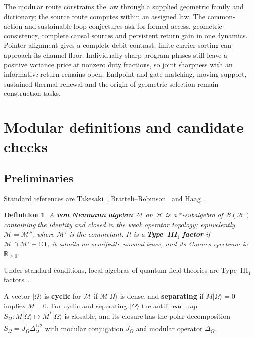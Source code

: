 \documentclass[12pt,a4paper]{article}
\newtheorem{definition}[theorem]{Definition}
\begin{document}
The modular route constrains the law through a supplied geometric family and
dictionary; the source route computes within an assigned law. The common-action
and sustainable-loop conjectures ask for formed access, geometric consistency,
complete causal sources and persistent return gain in one dynamics. Pointer
alignment gives a complete-debit contrast; finite-carrier sorting can approach
its channel floor. Individually sharp program phases still leave a positive
variance price at nonzero duty fractions, so joint sharpness with an informative
return remains open. Endpoint and gate matching, moving support, sustained
thermal renewal and the origin of geometric selection remain construction tasks.

\appendix

\section{Modular definitions and candidate checks}
\label{app:modular-details}

\subsection{Preliminaries}
\label{sec:modular-prelim}

Standard references are Takesaki~\cite{Takesaki2003}, Bratteli--Robinson~\cite{BratteliRobinson1997} and Haag~\cite{Haag1996}.

\begin{definition}
A \textbf{von Neumann algebra} $\mathcal{M}$ on $\mathcal{H}$ is a $*$-subalgebra of $\mathcal{B}(\mathcal{H})$ containing the identity and closed in the weak operator topology; equivalently $\mathcal{M} = \mathcal{M}''$, where $\mathcal{M}'$ is the commutant. It is a \textbf{Type~III$_1$ factor} if $\mathcal{M} \cap \mathcal{M}' = \mathbb{C} \mathbf{1}$, it admits no semifinite normal trace, and its Connes spectrum is $\mathbb{R}_{\geq 0}$.
\end{definition}

Under standard conditions, local algebras of quantum field theories are Type~III$_1$ factors~\cite{Haag1996, Yngvason2005}.

A vector $|\Omega\rangle$ is \textbf{cyclic} for $\mathcal{M}$ if $\mathcal{M}|\Omega\rangle$ is dense, and \textbf{separating} if $M|\Omega\rangle = 0$ implies $M = 0$. For cyclic and separating $|\Omega\rangle$ the antilinear map $S_\Omega : M|\Omega\rangle \mapsto M^*|\Omega\rangle$ is closable, and its closure has the polar decomposition $S_\Omega = J_\Omega \Delta_\Omega^{1/2}$ with modular conjugation $J_\Omega$ and modular operator $\Delta_\Omega$.
\end{document}
